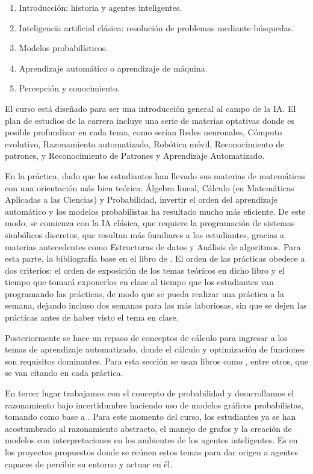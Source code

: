 \begin{enumerate}
 \item Introducción: historia y agentes inteligentes.
 \item Inteligencia artificial clásica: resolución de problemas mediante búsquedas.
 \item Modelos probabilísticos.
 \item Aprendizaje automático o aprendizaje de máquina.
 \item Percepción y conocimiento.
\end{enumerate}

El curso está diseñado para ser una introducción general al campo de la IA.  El plan de estudios de la carrera incluye una serie de materias optativas donde es posible profundizar en cada tema, como serían Redes neuronales, Cómputo evolutivo, Razonamiento automatizado, Robótica móvil, Reconocimiento de patrones, y Reconocimiento de Patrones y Aprendizaje Automatizado.

En la práctica, dado que los estudiantes han llevado sus materias de matemáticas con una orientación más bien teórica: Álgebra lineal, Cálculo (en Matemáticas Aplicadas a las Ciencias) y Probabilidad, invertir el orden del aprendizaje automático y los modelos probabilistas ha resultado mucho más eficiente.  De este modo, se comienza con la IA clásica, que requiere la programación de sistemas simbólicos discretos, que resultan más familiares a los estudiantes, gracias a materias antecedentes como Estructuras de datos y Análisis de algoritmos.  Para esta parte, la bibliografía base en el libro de \cite{Russell2010}.  El orden de las prácticas obedece a dos criterios: el orden de exposición de los temas teóricos en dicho libro y el tiempo que tomará exponerlos en clase al tiempo que los estudiantes van programando las prácticas, de modo que se pueda realizar una práctica a la semana, dejando incluso dos semanas para las más laboriosas, sin que se dejen las prácticas antes de haber visto el tema en clase.

Posteriormente se hace un repaso de conceptos de cálculo para ingresar a los temas de aprendizaje automatizado, donde el cálculo y optimización de funciones son requisitos dominantes.  Para esta sección se usan libros como \cite{Nengnevitsky2005, Mitchell1997}, entre otros, que se van citando en cada práctica.

En tercer lugar trabajamos con el concepto de probabilidad y desarrollamos el razonamiento bajo incertidumbre haciendo uso de modelos gráficos probabilistas, tomando como base a \cite{KollerFriedman2009}.  Para este momento del curso, los estudiantes ya se han acostumbrado al razonamiento abstracto, el manejo de grafos y la creación de modelos con interpretaciones en los ambientes de los agentes inteligentes.  Es en los proyectos propuestos donde se reúnen estos temas para dar origen a agentes capaces de percibir su entorno y actuar en él.

